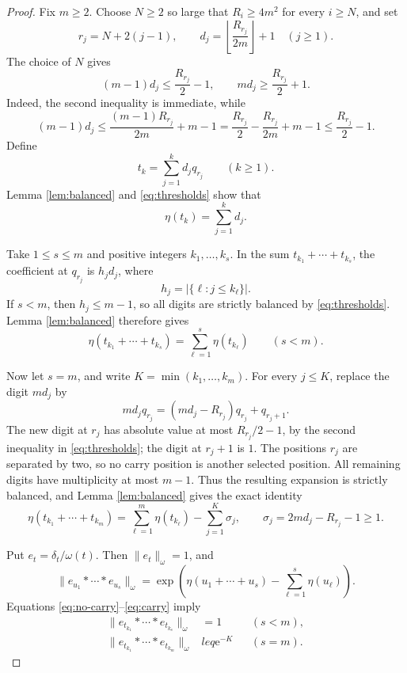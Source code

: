 \documentclass[11pt]{article}
\newcommand{\ee}{\mathrm e}
\begin{document}
\begin{proof}
Fix \(m\geq2\).  Choose \(N\geq2\) so large that
\(R_i\geq4m^2\) for every \(i\geq N\), and set
\[
 r_j=N+2(j-1),\qquad
 d_j=\left\lfloor\frac{R_{r_j}}{2m}\right\rfloor+1
 \quad(j\geq1).
\]
The choice of \(N\) gives
\begin{equation}\label{eq:thresholds}
 (m-1)d_j\leq \frac{R_{r_j}}2-1,
 \qquad
 m d_j\geq \frac{R_{r_j}}2+1.
\end{equation}
Indeed, the second inequality is immediate, while
\[
 (m-1)d_j
 \leq \frac{(m-1)R_{r_j}}{2m}+m-1
 =\frac{R_{r_j}}2-\frac{R_{r_j}}{2m}+m-1
 \leq\frac{R_{r_j}}2-1.
\]
Define
\[
 t_k=\sum_{j=1}^k d_jq_{r_j}\qquad(k\geq1).
\]
Lemma \ref{lem:balanced} and \eqref{eq:thresholds} show that
\begin{equation}\label{eq:length-tk}
 \eta(t_k)=\sum_{j=1}^kd_j.
\end{equation}

Take \(1\leq s\leq m\) and positive integers \(k_1,\ldots,k_s\).  In
the sum \(t_{k_1}+\cdots+t_{k_s}\), the coefficient at \(q_{r_j}\) is
\(h_jd_j\), where
\[
 h_j=|\{\ell:j\leq k_\ell\}|.
\]
If \(s<m\), then \(h_j\leq m-1\), so all digits are strictly balanced by
\eqref{eq:thresholds}.  Lemma \ref{lem:balanced} therefore gives
\begin{equation}\label{eq:no-carry}
 \eta(t_{k_1}+\cdots+t_{k_s})
 =\sum_{\ell=1}^s\eta(t_{k_\ell})
 \qquad(s<m).
\end{equation}

Now let \(s=m\), and write \(K=\min(k_1,\ldots,k_m)\).  For every
\(j\leq K\), replace the digit \(m d_j\) by
\[
 m d_jq_{r_j}
 =(m d_j-R_{r_j})q_{r_j}+q_{r_j+1}.
\]
The new digit at \(r_j\) has absolute value at most
\(R_{r_j}/2-1\), by the second inequality in
\eqref{eq:thresholds}; the digit at \(r_j+1\) is \(1\).  The positions
\(r_j\) are separated by two, so no carry position is another selected
position.  All remaining digits have multiplicity at most \(m-1\).
Thus the resulting expansion is strictly balanced, and Lemma
\ref{lem:balanced} gives the exact identity
\begin{equation}\label{eq:carry}
 \eta(t_{k_1}+\cdots+t_{k_m})
 =\sum_{\ell=1}^m\eta(t_{k_\ell})
  -\sum_{j=1}^{K}\sigma_j,
 \qquad
 \sigma_j=2m d_j-R_{r_j}-1\geq1.
\end{equation}

Put \(e_t=\delta_t/\omega(t)\).  Then \(\|e_t\|_\omega=1\), and
\begin{equation}\label{eq:norm}
 \|e_{u_1}*\cdots*e_{u_s}\|_\omega
 =\exp\!\left(
   \eta(u_1+\cdots+u_s)-\sum_{\ell=1}^s\eta(u_\ell)
 \right).
\end{equation}
Equations \eqref{eq:no-carry}--\eqref{eq:carry} imply
\begin{align}
 \|e_{t_{k_1}}*\cdots*e_{t_{k_s}}\|_\omega&=1
 &&(s<m),\label{eq:lower}\\
 \|e_{t_{k_1}}*\cdots*e_{t_{k_m}}\|_\omega&leq \ee^{-K}
 &&(s=m).\label{eq:upper}
\end{align}


\end{proof}
\end{document}
